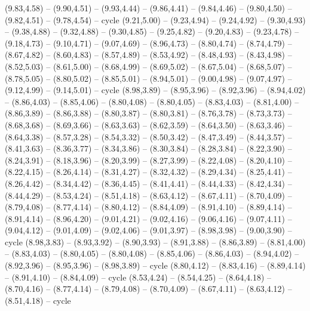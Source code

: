 \expandafter\def\csname geo:gebiet:KOR\endcsname{
  (9.83,4.58) -- (9.90,4.51) -- (9.93,4.44) -- (9.86,4.41) -- (9.84,4.46) -- (9.80,4.50) -- (9.82,4.51) -- (9.78,4.54) -- cycle}
\expandafter\def\csname geo:gebiet:MNG\endcsname{
  (9.21,5.00) -- (9.23,4.94) -- (9.24,4.92) -- (9.30,4.93) -- (9.38,4.88) -- (9.32,4.88) -- (9.30,4.85) -- (9.25,4.82) -- (9.20,4.83) -- (9.23,4.78) -- (9.18,4.73) -- (9.10,4.71) -- (9.07,4.69) -- (8.96,4.73) -- (8.80,4.74) -- (8.74,4.79) -- (8.67,4.82) -- (8.60,4.83) -- (8.57,4.89) -- (8.53,4.92) -- (8.48,4.93) -- (8.43,4.98) -- (8.52,5.03) -- (8.61,5.00) -- (8.68,4.99) -- (8.69,5.02) -- (8.67,5.04) -- (8.68,5.07) -- (8.78,5.05) -- (8.80,5.02) -- (8.85,5.01) -- (8.94,5.01) -- (9.00,4.98) -- (9.07,4.97) -- (9.12,4.99) -- (9.14,5.01) -- cycle}
\expandafter\def\csname geo:gebiet:IND\endcsname{
  (8.98,3.89) -- (8.95,3.96) -- (8.92,3.96) -- (8.94,4.02) -- (8.86,4.03) -- (8.85,4.06) -- (8.80,4.08) -- (8.80,4.05) -- (8.83,4.03) -- (8.81,4.00) -- (8.86,3.89) -- (8.86,3.88) -- (8.80,3.87) -- (8.80,3.81) -- (8.76,3.78) -- (8.73,3.73) -- (8.68,3.68) -- (8.69,3.66) -- (8.63,3.63) -- (8.62,3.59) -- (8.64,3.50) -- (8.63,3.46) -- (8.64,3.38) -- (8.57,3.28) -- (8.54,3.32) -- (8.50,3.42) -- (8.47,3.49) -- (8.44,3.57) -- (8.41,3.63) -- (8.36,3.77) -- (8.34,3.86) -- (8.30,3.84) -- (8.28,3.84) -- (8.22,3.90) -- (8.24,3.91) -- (8.18,3.96) -- (8.20,3.99) -- (8.27,3.99) -- (8.22,4.08) -- (8.20,4.10) -- (8.22,4.15) -- (8.26,4.14) -- (8.31,4.27) -- (8.32,4.32) -- (8.29,4.34) -- (8.25,4.41) -- (8.26,4.42) -- (8.34,4.42) -- (8.36,4.45) -- (8.41,4.41) -- (8.44,4.33) -- (8.42,4.34) -- (8.44,4.29) -- (8.53,4.24) -- (8.51,4.18) -- (8.63,4.12) -- (8.67,4.11) -- (8.70,4.09) -- (8.79,4.08) -- (8.77,4.14) -- (8.80,4.12) -- (8.84,4.09) -- (8.91,4.10) -- (8.89,4.14) -- (8.91,4.14) -- (8.96,4.20) -- (9.01,4.21) -- (9.02,4.16) -- (9.06,4.16) -- (9.07,4.11) -- (9.04,4.12) -- (9.01,4.09) -- (9.02,4.06) -- (9.01,3.97) -- (8.98,3.98) -- (9.00,3.90) -- cycle}
\expandafter\def\csname geo:gebiet:BGD\endcsname{
  (8.98,3.83) -- (8.93,3.92) -- (8.90,3.93) -- (8.91,3.88) -- (8.86,3.89) -- (8.81,4.00) -- (8.83,4.03) -- (8.80,4.05) -- (8.80,4.08) -- (8.85,4.06) -- (8.86,4.03) -- (8.94,4.02) -- (8.92,3.96) -- (8.95,3.96) -- (8.98,3.89) -- cycle}
\expandafter\def\csname geo:gebiet:BTN\endcsname{
  (8.80,4.12) -- (8.83,4.16) -- (8.89,4.14) -- (8.91,4.10) -- (8.84,4.09) -- cycle}
\expandafter\def\csname geo:gebiet:NPL\endcsname{
  (8.53,4.24) -- (8.54,4.25) -- (8.64,4.18) -- (8.70,4.16) -- (8.77,4.14) -- (8.79,4.08) -- (8.70,4.09) -- (8.67,4.11) -- (8.63,4.12) -- (8.51,4.18) -- cycle}
